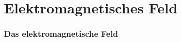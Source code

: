\section*{Elektro\-magnetisches Feld}
\begin{frame}
\frametitle{Das elektromagnetische Feld}


\end{frame}
